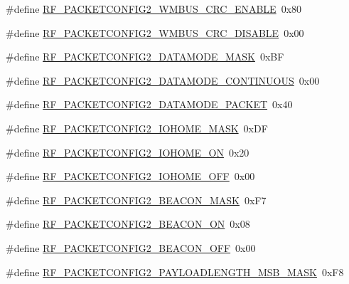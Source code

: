 \begin{DoxyCompactItemize}
\item 
\#define \mbox{\hyperlink{sx1276_regs-_fsk_8h_a5c8e0ba4aa3a5fe54ad3bc55a8119856}{R\+F\+\_\+\+P\+A\+C\+K\+E\+T\+C\+O\+N\+F\+I\+G2\+\_\+\+W\+M\+B\+U\+S\+\_\+\+C\+R\+C\+\_\+\+E\+N\+A\+B\+LE}}~0x80
\item 
\#define \mbox{\hyperlink{sx1276_regs-_fsk_8h_aa806ad7df0d57492cde33c501aff3861}{R\+F\+\_\+\+P\+A\+C\+K\+E\+T\+C\+O\+N\+F\+I\+G2\+\_\+\+W\+M\+B\+U\+S\+\_\+\+C\+R\+C\+\_\+\+D\+I\+S\+A\+B\+LE}}~0x00
\item 
\#define \mbox{\hyperlink{sx1276_regs-_fsk_8h_abb4848f4bf2f260a572db2e1b7fa8f0b}{R\+F\+\_\+\+P\+A\+C\+K\+E\+T\+C\+O\+N\+F\+I\+G2\+\_\+\+D\+A\+T\+A\+M\+O\+D\+E\+\_\+\+M\+A\+SK}}~0x\+BF
\item 
\#define \mbox{\hyperlink{sx1276_regs-_fsk_8h_a4882838bfea73af51a7e1184a4fd5f6a}{R\+F\+\_\+\+P\+A\+C\+K\+E\+T\+C\+O\+N\+F\+I\+G2\+\_\+\+D\+A\+T\+A\+M\+O\+D\+E\+\_\+\+C\+O\+N\+T\+I\+N\+U\+O\+US}}~0x00
\item 
\#define \mbox{\hyperlink{sx1276_regs-_fsk_8h_a4796ee777b3c32fa2a8ae19b434a1b99}{R\+F\+\_\+\+P\+A\+C\+K\+E\+T\+C\+O\+N\+F\+I\+G2\+\_\+\+D\+A\+T\+A\+M\+O\+D\+E\+\_\+\+P\+A\+C\+K\+ET}}~0x40
\item 
\#define \mbox{\hyperlink{sx1276_regs-_fsk_8h_aec749b50706dc81b547897200273b2a6}{R\+F\+\_\+\+P\+A\+C\+K\+E\+T\+C\+O\+N\+F\+I\+G2\+\_\+\+I\+O\+H\+O\+M\+E\+\_\+\+M\+A\+SK}}~0x\+DF
\item 
\#define \mbox{\hyperlink{sx1276_regs-_fsk_8h_ab3fecfa9a81a7642916f87732b105c60}{R\+F\+\_\+\+P\+A\+C\+K\+E\+T\+C\+O\+N\+F\+I\+G2\+\_\+\+I\+O\+H\+O\+M\+E\+\_\+\+ON}}~0x20
\item 
\#define \mbox{\hyperlink{sx1276_regs-_fsk_8h_a4c835d63f6e0105443e2ce5353f9f7fb}{R\+F\+\_\+\+P\+A\+C\+K\+E\+T\+C\+O\+N\+F\+I\+G2\+\_\+\+I\+O\+H\+O\+M\+E\+\_\+\+O\+FF}}~0x00
\item 
\#define \mbox{\hyperlink{sx1276_regs-_fsk_8h_a1c363971f1c7a8065204bc8c6f156333}{R\+F\+\_\+\+P\+A\+C\+K\+E\+T\+C\+O\+N\+F\+I\+G2\+\_\+\+B\+E\+A\+C\+O\+N\+\_\+\+M\+A\+SK}}~0x\+F7
\item 
\#define \mbox{\hyperlink{sx1276_regs-_fsk_8h_a454732572980957a184bc0ad1b0248e4}{R\+F\+\_\+\+P\+A\+C\+K\+E\+T\+C\+O\+N\+F\+I\+G2\+\_\+\+B\+E\+A\+C\+O\+N\+\_\+\+ON}}~0x08
\item 
\#define \mbox{\hyperlink{sx1276_regs-_fsk_8h_a06a6c1e69dfcb07cc709d00d5935e43d}{R\+F\+\_\+\+P\+A\+C\+K\+E\+T\+C\+O\+N\+F\+I\+G2\+\_\+\+B\+E\+A\+C\+O\+N\+\_\+\+O\+FF}}~0x00
\item 
\#define \mbox{\hyperlink{sx1276_regs-_fsk_8h_a2a5f92482f4317a5eadb24f9ffe5443d}{R\+F\+\_\+\+P\+A\+C\+K\+E\+T\+C\+O\+N\+F\+I\+G2\+\_\+\+P\+A\+Y\+L\+O\+A\+D\+L\+E\+N\+G\+T\+H\+\_\+\+M\+S\+B\+\_\+\+M\+A\+SK}}~0x\+F8

\end{DoxyCompactItemize}
